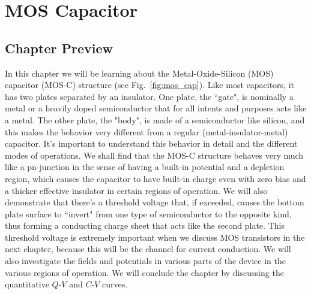 \chapter{MOS Capacitor}
\graphicspath{{./figs_MOS_C/}}
\section{Chapter Preview}
In this chapter we will be learning about the Metal-Oxide-Silicon (MOS) capacitor (MOS-C) structure (see Fig.~\ref{fig:mos_cap}).  Like most capacitors, it has two plates separated by an insulator.  One plate, the ``gate",  is nominally a metal or a heavily doped semiconductor that for all intents and purposes acts like a metal.  The other plate, the "body",  is made of a semiconductor like silicon, and this makes the behavior very different from a regular (metal-insulator-metal) capacitor. It's important to understand this behavior in detail and the different modes of operations.   We shall find that the MOS-C structure behaves very much like a pn-junction in the sense of having a built-in potential and a depletion region, which causes the capacitor to have built-in charge even with zero bias and a thicker effective insulator in certain regions of operation.  We will also demonstrate that there's a threshold voltage that, if exceeded, causes the bottom plate surface to ``invert" from one type of semiconductor to the opposite kind, thus forming a conducting charge sheet that acts like the second plate.  This threshold voltage is extremely important when we discuss MOS transistors in the next chapter, because this will be the channel for current conduction.  We will also investigate the fields and potentials in various parts of the device in the various regions of operation.  We will conclude the chapter by discussing the quantitative  $Q$-$V$ and $C$-$V$ curves.
